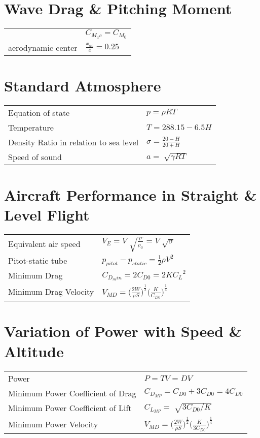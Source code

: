 \documentclass[a4paper,9pt]{extarticle}
\begin{document}
\begin{multicols*}{2}
\section{Wave Drag \& Pitching Moment}
\begin{tabular}{ll}
 & $C_{M_ac}=C_{M_0}$\\
aerodynamic center & $\frac{x_{ac}}{c}=0.25$
\end{tabular}
\section{Standard Atmosphere}

\begin{tabular}{ll}
Equation of state & $p=\rho RT$\\
Temperature & $T=288.15-6.5H$\\
Density Ratio in relation to sea level & $ \sigma = \frac{20-H}{20+H}$\\
Speed of sound & $a=\sqrt[]{\gamma R T}$\\
\end{tabular}

\section{Aircraft Performance in Straight \& Level Flight}

\begin{tabular}{ll}
Equivalent air speed & $V_E=V\sqrt[]{\frac{\rho}{{\rho}_0}}=V \sqrt[]{\sigma}$\\
Pitot-static tube & $p_{pitot}-p_{static}=\frac{1}{2}\rho V^2$\\
Minimum Drag & $C_{D_min}=2 C_{D0}=2K{C_L}^2$\\
Minimum Drag Velocity & $V_{MD}={\Big({\frac{2W}{\rho S}}\Big)}^{\frac{1}{2}} {\Big({\frac{K}{C_{D0}}}\Big)}^{\frac{1}{4}} $
\end{tabular}


\section{Variation of Power with Speed \& Altitude}

\begin{tabular}{ll}
Power & $P=TV=DV$\\
Minimum Power Coefficient of Drag & $C_{D_{MP}}=C_{D0}+3C_{D0}=4C_{D0}$\\
Minimum Power Coefficient of Lift & $C_{L_{MP}}=\sqrt[]{3C_{D0}/K}$\\
Minimum Power Velocity & $V_{MD}={\Big({\frac{2W}{\rho S}}\Big)}^{\frac{1}{2}} {\Big({\frac{K}{3C_{D0}}}\Big)}^{\frac{1}{4}} $
\end{tabular}


\end{multicols*}
\end{document}
